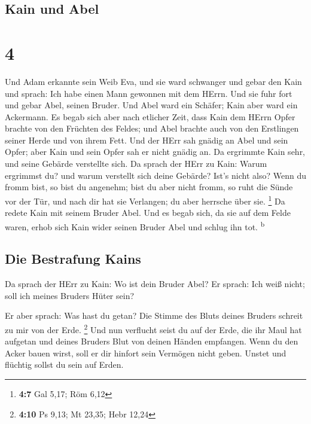 \hypertarget{kain-und-abel}{%
\subsection{Kain und Abel}\label{kain-und-abel}}

\hypertarget{section-3}{%
\section{4}\label{section-3}}

 Und Adam erkannte sein Weib Eva, und sie ward schwanger
und gebar den Kain und sprach: Ich habe einen Mann gewonnen mit dem
HErrn.  Und sie fuhr fort und gebar Abel, seinen Bruder.
Und Abel ward ein Schäfer; Kain aber ward ein Ackermann. 
Es begab sich aber nach etlicher Zeit, dass Kain dem HErrn Opfer brachte
von den Früchten des Feldes;  und Abel brachte auch von
den Erstlingen seiner Herde und von ihrem Fett. Und der HErr sah gnädig
an Abel und sein Opfer;  aber Kain und sein Opfer sah er
nicht gnädig an. Da ergrimmte Kain sehr, und seine Gebärde verstellte
sich.  Da sprach der HErr zu Kain: Warum ergrimmst du? und
warum verstellt sich deine Gebärde?  Ist's nicht also?
Wenn du fromm bist, so bist du angenehm; bist du aber nicht fromm, so
ruht die Sünde vor der Tür, und nach dir hat sie Verlangen; du aber
herrsche über sie. \footnote{\textbf{4:7} Gal 5,17; Röm 6,12}
 Da redete Kain mit seinem Bruder Abel. Und es begab sich,
da sie auf dem Felde waren, erhob sich Kain wider seinen Bruder Abel und
schlug ihn tot. \textsuperscript{b}

\hypertarget{die-bestrafung-kains}{%
\subsection{Die Bestrafung Kains}\label{die-bestrafung-kains}}

 Da sprach der HErr zu Kain: Wo ist dein Bruder Abel? Er
sprach: Ich weiß nicht; soll ich meines Bruders Hüter sein?

 Er aber sprach: Was hast du getan? Die Stimme des Bluts
deines Bruders schreit zu mir von der Erde. \footnote{\textbf{4:10} Ps
  9,13; Mt 23,35; Hebr 12,24}  Und nun verflucht seist du
auf der Erde, die ihr Maul hat aufgetan und deines Bruders Blut von
deinen Händen empfangen.  Wenn du den Acker bauen wirst,
soll er dir hinfort sein Vermögen nicht geben. Unstet und flüchtig
sollst du sein auf Erden.

